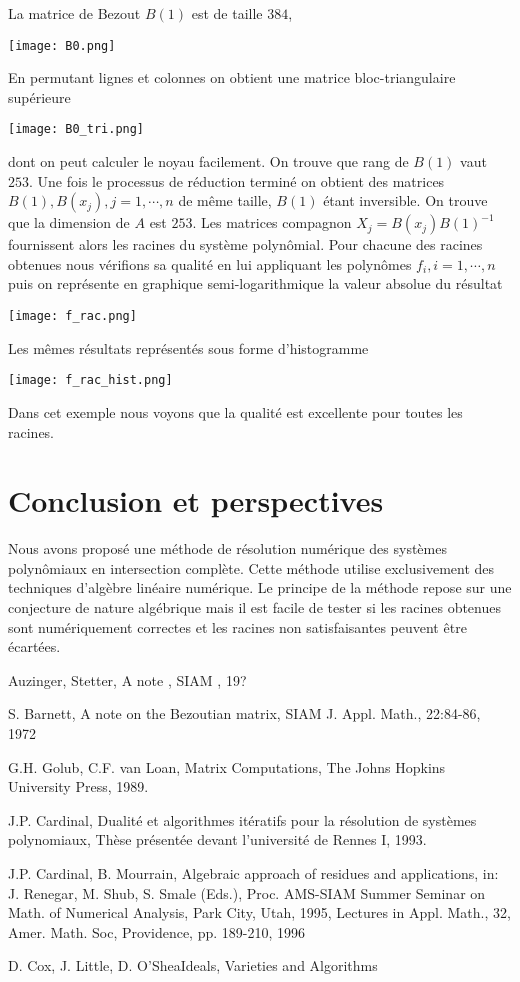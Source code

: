 \documentclass{article}
\theoremstyle{plain}%
\theoremstyle{definition}
\theoremstyle{remark}
\begin{document}
La matrice de Bezout $B(1)$ est de taille $384$,
 \begin{center}
\texttt{[image: B0.png]}
\end{center}


En permutant lignes et colonnes on obtient une matrice bloc-triangulaire supérieure
 \begin{center}
\texttt{[image: B0\_tri.png]}
\end{center}
dont on peut calculer le noyau facilement. On trouve que rang de $B(1)$ vaut $253$.
Une fois le processus de réduction terminé on obtient des matrices $B(1), B(x_j), j=1,\cdots,n$ de même taille, $B(1)$ étant inversible. On trouve que la dimension de $A$ est $253$. Les matrices compagnon $X_j = B(x_j)B(1)^{-1}$ fournissent alors les racines du système polynômial. Pour chacune des racines obtenues nous vérifions sa qualité en lui appliquant les polynômes $f_i, i=1,\cdots,n$ puis on représente en graphique semi-logarithmique la  valeur absolue du résultat
 \begin{center}
\texttt{[image: f\_rac.png]}
\end{center}
Les mêmes résultats représentés sous forme d'histogramme
 \begin{center}
\texttt{[image: f\_rac\_hist.png]}
\end{center}

Dans cet exemple nous voyons que la qualité est excellente pour toutes les racines.
\section{Conclusion et perspectives}
Nous avons proposé une méthode de résolution numérique des systèmes polynômiaux en intersection complète. Cette méthode utilise exclusivement des techniques d'algèbre linéaire numérique. Le principe de la méthode repose sur une conjecture de nature algébrique mais il est facile de tester si les racines obtenues sont numériquement correctes et les racines non satisfaisantes peuvent être écartées.

\begin{thebibliography}{00}

{Auzinger, Stetter}, {A note }, {SIAM }, {19?}

{S. Barnett}, {A note on the Bezoutian matrix}, {SIAM J. Appl. Math., 22:84-86}, {1972}

{G.H. Golub, C.F. van Loan}, {Matrix Computations}, {The Johns Hopkins University Press}, {1989}.

{J.P. Cardinal}, {Dualité et algorithmes itératifs pour la résolution de systèmes polynomiaux}, {Thèse présentée devant l'université de Rennes I}, {1993}.

{J.P. Cardinal, B. Mourrain}, {Algebraic approach of residues and applications}, {in: J. Renegar, M. Shub, S. Smale (Eds.), Proc. AMS-SIAM Summer Seminar on Math. of Numerical Analysis, Park City, Utah, 1995, Lectures in Appl. Math., 32, Amer. Math. Soc, Providence, pp. 189-210}, {1996}

{D. Cox, J. Little, D. O'Shea}{Ideals, Varieties and Algorithms}
\end{thebibliography}
\end{document}
